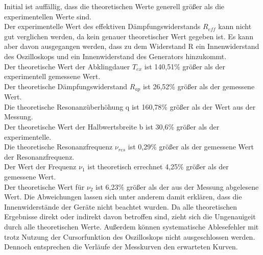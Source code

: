 Initial ist auffällig, dass die theoretischen Werte generell größer als die experimentellen Werte sind.
\\Der experimentelle Wert des effektiven Dämpfungswiderstands $R_{eff}$ kann nicht gut verglichen werden, da kein genauer theoretischer Wert gegeben ist.
Es kann aber davon ausgegangen werden, dass zu dem Widerstand R ein Innenwiderstand des Oszilloskops und ein Innenwiderstand des Generators hinzukommt.
\\Der theoretische Wert der Abklingdauer $T_{ex}$ ist 140,51\% größer als der experimentell gemessene Wert.
\\Der theoretische Dämpfungswiderstand $R_{ap}$ ist 26,52\% größer als der gemessene Wert.
\\Die theoretische Resonanzüberhöhung q ist 160,78\% größer als der Wert aus der Messung.
\\Der theoretische Wert der Halbwertsbreite b ist 30,6\% größer als der experimentelle.
\\Die theoretische Resonanzfrequenz $\nu_{res}$ ist 0,29\% größer als der gemessene Wert der Resonanzfrequenz.
\\Der Wert der Frequenz $\nu_{1}$ ist theoretisch errechnet 4,25\% größer als der gemessene Wert.
\\Der theoretische Wert für $\nu_{2}$ ist 6,23\% größer als der aus der Messung abgelesene Wert.
Die Abweichungen lassen sich unter anderem damit erklären, dass die Innenwiderstände der Geräte nicht beachtet wurden.
Da alle theoretischen Ergebnisse direkt oder indirekt davon betroffen sind, zieht sich die Ungenauigeit durch alle theoretischen Werte.
Außerdem können systematische Ablesefehler mit trotz Nutzung der Cursorfunktion des Oszilloskops nicht ausgeschlossen werden.
\\Dennoch entsprechen die Verläufe der Messkurven den erwarteten Kurven.
